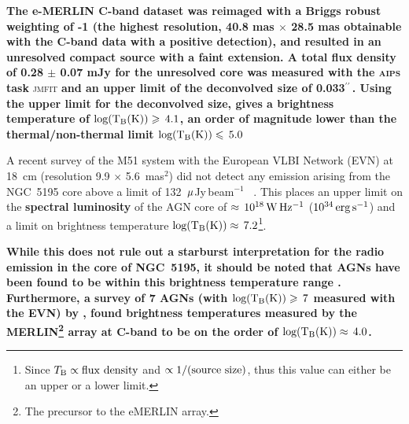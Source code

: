 \documentclass[fleqn,usenatbib]{mnras}
\def\arcs{$^{\prime\prime}\,$}
\def\mujybm   {${\rm \mu}$Jy\,beam$^{-1}$}
\begin{document}
\textbf{The e-MERLIN C-band dataset was reimaged with a Briggs robust weighting of -1 (the highest 
resolution, 40.8 mas $\times$ 28.5 mas obtainable with the C-band data with a positive 
detection), and resulted in an unresolved compact source with a faint extension. A total flux 
density of 0.28 $\pm$ 0.07 mJy for the unresolved core was measured with the \textsc{aips}} \textbf{task} \textsc{jmfit} \textbf{and an upper limit of the deconvolved size of 0.033\arcs. Using the upper limit for the deconvolved size, gives a brightness temperature of ${\rm log(T_{B} (K))}\geq\,4.1$, an order of magnitude lower than the thermal/non-thermal limit  ${\rm log(T_{B} (K))}\leq\,5.0$ \citep{Condon1992}}


A recent survey of the M51 system with the European VLBI Network (EVN) at 18~cm (resolution 9.9 $\times$ 5.6~mas$^{2}$) did not detect any emission arising from 
the NGC~5195 core above a limit of 132~\mujybm~ \citep{Rampadarathetal15}. This places an upper 
limit on the \textbf{spectral luminosity} of the AGN core of $\approx\,10^{18}\,{\rm W\,Hz^{-1}}$ 
($10^{34}\,{\rm erg\,s^{-1}}$) and a limit on brightness temperature ${\rm log(T_{B} (K))}\approx\,7.2$\footnote{Since $T_{\rm B} \propto {\rm flux~density}$ and $\propto {\rm 1/(source~size)}$, thus this value can either be an upper or a lower limit.}.  

\textbf{While this does not rule out a starburst interpretation for the radio emission in the core of NGC~5195, it should be noted that AGNs have been found to be within this brightness temperature range \citep{Garrett2001}. Furthermore, a survey of 7 AGNs (with ${\rm log(T_{B} (K))}\geq\,7$ measured with the EVN) by \cite{Krips+2007}, found brightness temperatures measured by the MERLIN\footnote{The precursor to the eMERLIN array.}  array at C-band to be on the order of ${\rm log(T_{B} (K))}\approx\,4.0$.}
\end{document}
